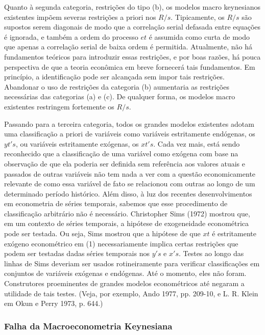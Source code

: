 \documentclass[a4paper,12pt]{article}[abntex2]
\begin{document}
Quanto à segunda categoria, restrições do tipo (b), os modelos macro keynesianos existentes impõem severas restrições a priori nos $R/s$. Tipicamente, os $R/s$ são supostos serem diagonais de modo que a correlação serial defasada entre equações é ignorada, e também a ordem do processo $et$ é assumida como curta de modo que apenas a correlação serial de baixa ordem é permitida. Atualmente, não há fundamentos teóricos para introduzir essas restrições, e por boas razões, há pouca perspectiva de que a teoria econômica em breve fornecerá tais fundamentos. Em princípio, a identificação pode ser alcançada sem impor tais restrições. Abandonar o uso de restrições da categoria (b) aumentaria as restrições necessárias das categorias (a) e (c). De qualquer forma, os modelos macro existentes restringem fortemente os $R/s$.

Passando para a terceira categoria, todos os grandes modelos existentes adotam uma classificação a priori de variáveis como variáveis estritamente endógenas, os $yt's$, ou variáveis estritamente exógenas, os $xt's$. Cada vez mais, está sendo reconhecido que a classificação de uma variável como exógena com base na observação de que ela poderia ser definida sem referência aos valores atuais e passados de outras variáveis não tem nada a ver com a questão economicamente relevante de como essa variável de fato se relacionou com outras ao longo de um determinado período histórico. Além disso, à luz dos recentes desenvolvimentos em econometria de séries temporais, sabemos que esse procedimento de classificação arbitrário não é necessário. Christopher Sims (1972) mostrou que, em um contexto de séries temporais, a hipótese de exogeneidade econométrica pode ser testada. Ou seja, Sims mostrou que a hipótese de que $xt$ é estritamente exógeno econométrico em (1) necessariamente implica certas restrições que podem ser testadas dadas séries temporais nos $y's$ e $x's$. Testes ao longo das linhas de Sims deveriam ser usados rotineiramente para verificar classificações em conjuntos de variáveis exógenas e endógenas. Até o momento, eles não foram. Construtores proeminentes de grandes modelos econométricos até negaram a utilidade de tais testes. (Veja, por exemplo, Ando 1977, pp. 209-10, e L. R. Klein em Okun e Perry 1973, p. 644.)

\subsubsection{\textbf{Falha da Macroeconometria Keynesiana}}
\end{document}
